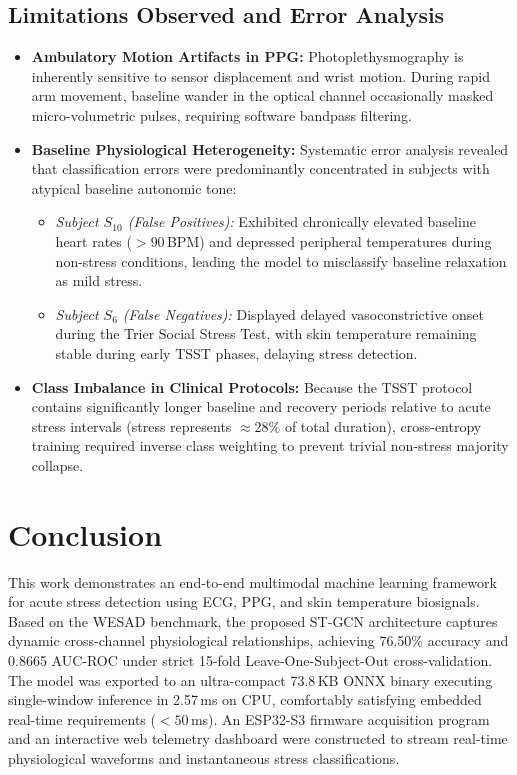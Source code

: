 \documentclass[11pt,a4paper]{article}
\begin{document}
\subsection{Limitations Observed and Error Analysis}
\begin{itemize}
    \item \textbf{Ambulatory Motion Artifacts in PPG:} Photoplethysmography is inherently sensitive to sensor displacement and wrist motion. During rapid arm movement, baseline wander in the optical channel occasionally masked micro-volumetric pulses, requiring software bandpass filtering.
    \item \textbf{Baseline Physiological Heterogeneity:} Systematic error analysis revealed that classification errors were predominantly concentrated in subjects with atypical baseline autonomic tone:
    \begin{itemize}
        \item \emph{Subject $S_{10}$ (False Positives):} Exhibited chronically elevated baseline heart rates ($> 90$\,BPM) and depressed peripheral temperatures during non-stress conditions, leading the model to misclassify baseline relaxation as mild stress.
        \item \emph{Subject $S_6$ (False Negatives):} Displayed delayed vasoconstrictive onset during the Trier Social Stress Test, with skin temperature remaining stable during early TSST phases, delaying stress detection.
    \end{itemize}
    \item \textbf{Class Imbalance in Clinical Protocols:} Because the TSST protocol contains significantly longer baseline and recovery periods relative to acute stress intervals (stress represents $\approx 28\%$ of total duration), cross-entropy training required inverse class weighting to prevent trivial non-stress majority collapse.
\end{itemize}

\section{Conclusion}

This work demonstrates an end-to-end multimodal machine learning framework for acute stress detection using ECG, PPG, and skin temperature biosignals. Based on the WESAD benchmark, the proposed ST-GCN architecture captures dynamic cross-channel physiological relationships, achieving 76.50\% accuracy and 0.8665 AUC-ROC under strict 15-fold Leave-One-Subject-Out cross-validation. The model was exported to an ultra-compact 73.8\,KB ONNX binary executing single-window inference in 2.57\,ms on CPU, comfortably satisfying embedded real-time requirements ($< 50$\,ms). An ESP32-S3 firmware acquisition program and an interactive web telemetry dashboard were constructed to stream real-time physiological waveforms and instantaneous stress classifications.
\end{document}
